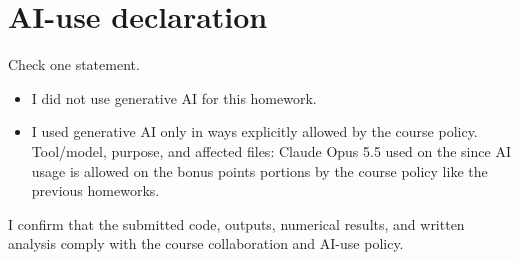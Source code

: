 \documentclass[11pt]{article}
\begin{document}
\section*{AI-use declaration}
Check one statement.

\begin{itemize}
  \item[$\square$] I did not use generative AI for this homework.
  \item[$\boxtimes$] I used generative AI only in ways explicitly allowed by
  the course policy. Tool/model, purpose, and affected files:
  Claude Opus 5.5 used on the  since AI usage is allowed on the bonus points portions by the course policy like the previous homeworks.
\end{itemize}

I confirm that the submitted code, outputs, numerical results, and written
analysis comply with the course collaboration and AI-use policy.
\end{document}
